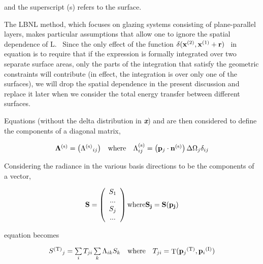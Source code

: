 and the superscript (s) refers to the surface.

The LBNL method, which focuses on glazing systems consisting of plane-parallel layers, makes particular assumptions that allow one to ignore the spatial dependence of L.~ Since the only effect of the function \(\delta ({{\bf{x}}^{{\rm{(2)}}}},{{\bf{x}}^{{\rm{(1)}}}} + {\bf{r}})\) ~in equation is to require that if the expression is formally integrated over two separate surface areas, only the parts of the integration that satisfy the geometric constraints will contribute (in effect, the integration is over only one of the surfaces), we will drop the spatial dependence in the present discussion and replace it later when we consider the total energy transfer between different surfaces.

Equations (without the delta distribution in \textbf{\emph{x}}) and are then considered to define the components of a diagonal matrix,

\begin{equation}
\begin{array}{*{20}{c}}{{\bf{\Lambda }^{{\rm{(s)}}}} = \left( {{\Lambda ^{{\rm{(s)}}}}_{ij}} \right)}&{{\rm{where}}}&{\Lambda_{ij}^{{\rm{(s)}}} = \left( {{{\bf{p}}_j}\cdot {{\bf{n}}^{{\rm{(s)}}}}} \right)\Delta {\Omega_j}{\delta_{ij}}}\end{array}
\end{equation}

Considering the radiance in the various basis directions to be the components of a vector,

\begin{equation}
\bf{S} = \left( 
    \begin{array}{c}
      S_1 \\ ... \\ S_j \\ ...
    \end{array}
  \right)
  \text{where}
  S_j = S(\bf{p}_j)
\end{equation}

equation becomes

\begin{equation}
\begin{array}{*{20}{c}}{{S^{{\rm{(T)}}}}_j = \sum\limits_i {{T_{ji}}} \sum\limits_k {{\Lambda_{ik}}} {S_k}}&{{\rm{where}}}&{{T_{ji}} = {\mathop{\rm T}\nolimits} ({{\bf{p}}_j}^{{\rm{(T)}}},{{\bf{p}}_i}^{{\rm{(I)}}})}\end{array}
\end{equation}

